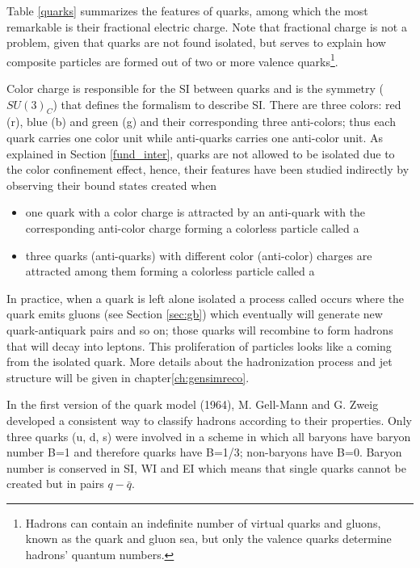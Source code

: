 Table \ref{quarks} summarizes the features of quarks, among which the most remarkable is their fractional electric charge. Note that fractional charge is not a problem, given that quarks are not found isolated, but serves to explain how composite particles are formed out of two or more valence quarks\footnote{Hadrons can contain an indefinite number of virtual quarks and gluons, known as the quark and gluon sea, but only the valence quarks determine hadrons' quantum numbers.}.

Color charge is responsible for the SI between quarks and is the symmetry ($SU(3)_C$) that defines the formalism to describe SI. There are three colors: red (r), blue (b) and green (g) and their corresponding three anti-colors; thus each quark carries one color unit while anti-quarks carries one anti-color unit. As explained in Section \ref{fund_inter}, quarks are not allowed to be isolated due to the color confinement effect, hence, their features have been studied indirectly by observing their bound states created when

\begin{itemize}
\item one quark with a color charge is attracted by an anti-quark with the corresponding anti-color charge forming a colorless particle called a 
\item three quarks (anti-quarks) with different color (anti-color) charges are attracted among them forming a colorless particle called a           
\end{itemize}

In practice, when a quark is left alone isolated a process called  occurs where the quark emits gluons (see Section \ref{sec:gb}) which eventually will generate new quark-antiquark pairs and so on; those quarks will recombine to form hadrons that will decay into leptons. This proliferation of particles looks like a  coming from the isolated quark. More details about the hadronization process and jet structure will be given in chapter\ref{ch:gensimreco}.         

In the first version of the quark model (1964), M. Gell-Mann\cite{gellman} and G. Zweig\cite{zweig,zweig2} developed a consistent way to classify hadrons according to their properties. Only three quarks (u, d, s) were involved in a scheme in which all baryons have baryon number B=1 and therefore quarks have B=1/3; non-baryons have B=0. Baryon number is conserved in SI, WI and EI which means that single quarks cannot be created but in pairs $q-\bar{q}$.

